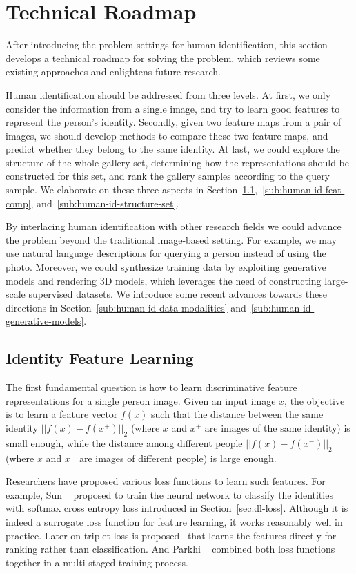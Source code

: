 \section{Technical Roadmap} %
\label{sec:human-id-tech-roadmap}
After introducing the problem settings for human identification, this section develops a technical roadmap for solving the problem, which reviews some existing approaches and enlightens future research.

Human identification should be addressed from three levels. At first, we only consider the information from a single image, and try to learn good features to represent the person's identity. Secondly, given two feature maps from a pair of images, we should develop methods to compare these two feature maps, and predict whether they belong to the same identity. At last, we could explore the structure of the whole gallery set, determining how the representations should be constructed for this set, and rank the gallery samples according to the query sample. We elaborate on these three aspects in Section~\ref{sub:human-id-feat-learn},~\ref{sub:human-id-feat-comp}, and~\ref{sub:human-id-structure-set}.

By interlacing human identification with other research fields we could advance the problem beyond the traditional image-based setting. For example, we may use natural language descriptions for querying a person instead of using the photo. Moreover, we could synthesize training data by exploiting generative models and rendering 3D models, which leverages the need of constructing large-scale supervised datasets. We introduce some recent advances towards these directions in Section~\ref{sub:human-id-data-modalities} and~\ref{sub:human-id-generative-models}.

\subsection{Identity Feature Learning} %
\label{sub:human-id-feat-learn}
The first fundamental question is how to learn discriminative feature representations for a single person image. Given an input image $x$, the objective is to learn a feature vector $f(x)$ such that the distance between the same identity $||f(x)-f(x^+)||_2$ (where $x$ and $x^+$ are images of the same identity) is small enough, while the distance among different people $||f(x)-f(x^-)||_2$ (where $x$ and $x^-$ are images of different people) is large enough.

Researchers have proposed various loss functions to learn such features. For example, Sun \etal~\cite{sun2014deep1,sun2014deep2} proposed to train the neural network to classify the identities with softmax cross entropy loss introduced in Section~\ref{sec:dl-loss}. Although it is indeed a surrogate loss function for feature learning, it works reasonably well in practice. Later on triplet loss is proposed~\cite{taigman2014deepface} that learns the features directly for ranking rather than classification. And Parkhi \etal~\cite{parkhi2015deep} combined both loss functions together in a multi-staged training process.

